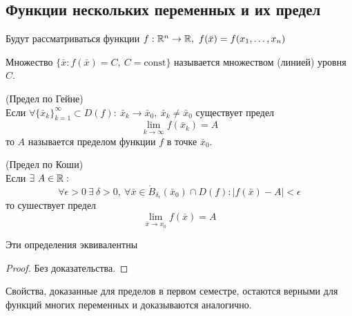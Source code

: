 \subsection{Функции нескольких переменных и их предел}
Будут рассматриваться функции $f: \mathbb{R}^n\to \mathbb{R},\ f(\bar{x})=f(x_1, \dots, x_n)$
\begin{definition}
    Множество $\{\bar{x}: f(\bar{x})=C,\ C=\text{const}\}$ называется множеством (линией) уровня $C$.
\end{definition} 
\begin{definition} (Предел по Гейне)\\
    Если $\forall \{\bar{x}_k\}_{k=1}^{\infty}\subset D(f):\ \bar{x}_k\to \bar{x}_0,\ \bar{x}_k\ne \bar{x}_0$ существует предел
    \[\lim\limits_{k\to \infty}f(\bar{x}_k)=A\]
    то $A$ называется пределом функции $f$ в точке $\bar{x}_0$.
\end{definition} 
\begin{definition} (Предел по Коши)\\
    Если $\exists\ A\in \mathbb{R}:$
    \[\forall \epsilon>0\ \exists\ \delta>0,\ \forall \bar{x}\in \mathring{B}_{\delta_\epsilon}(\bar{x}_0)\cap D(f): |f(\bar{x})-A|<\epsilon\]
    то сушествует предел 
    \[\lim\limits_{\bar{x}\to x_0}f(\bar{x})=A\]
\end{definition} 
\begin{theorem}
    Эти определения эквивалентны
\end{theorem} 
\begin{proof}
    Без доказательства.
\end{proof} 
\begin{comm}
    Свойства, доказанные для пределов в первом семестре, остаются верными для функций многих переменных и доказываются аналогично.
\end{comm} 